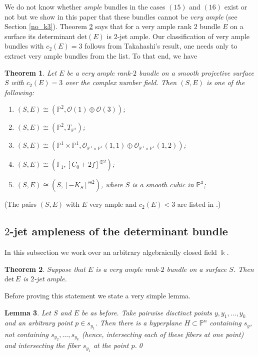 \documentclass[a4paper]{amsart}
\theoremstyle{plain}
\newtheorem{theorem}{Theorem}[section]
\newtheorem{lemma}[theorem]{Lemma}
\theoremstyle{definition}
\begin{document}
We do not know whether \textit{ample} bundles in the cases $(15)$ and $(16)$ exist or not but we show in this paper that these bundles cannot be \textit{very ample} (see Section \ref{no_k3}).
Theorem \ref{2-jet} says that for a very ample rank $2$ bundle $E$ on a surface its determinant $\mathrm{det}(E)$ is $2$-jet ample.
Our classification of very ample bundles with $c_2(E) = 3$ follows from Takahashi's result, one needs only to extract very ample bundles from the list.
To that end, we have
\begin{theorem}
    \label{classification3}
    Let $E$ be a very ample rank-$2$ bundle on a smooth projective surface $S$ with $c_2(E) = 3$ over the complex number field.
    Then $(S, E)$ is one of the following:
    \begin{enumerate}
        \item $(S, E) \cong (\mathbb P^2, \mathcal O(1)\oplus \mathcal O(3))$;
        \item $(S, E) \cong (\mathbb P^2, T_{\mathbb P^2})$;
        \item $(S, E) \cong (\mathbb P^1 \times \mathbb P^1, \mathcal O_{\mathbb P^1 \times \mathbb P^1}(1,1)\oplus  \mathcal O_{\mathbb P^1 \times \mathbb P^1}(1,2))$;
        \item $(S, E) \cong (\mathbb F_1, [C_0 + 2f]^{\oplus 2})$;
        \item $(S, E) \cong (S, [-K_S]^{\oplus 2})$, where $S$ is a smooth cubic in $\mathbb P^3$;
    \end{enumerate}
\end{theorem}

(The pairs $(S, E)$ with $E$ very ample and $c_2(E) < 3$ are listed in \cite[Theorem 11.1.3 and Theorem 11.4.5]{adjunction_theory}.)

\subsection{$2$-jet ampleness of the determinant bundle}
\label{2jetsection}
In this subsection we work over an arbitrary algebraically closed field $\Bbbk$.
\begin{theorem}
    \label{2-jet}
    Suppose that $E$ is a very ample rank-$2$ bundle on a surface $S$.
    Then $\mathrm{det}\, E$ is $2$-jet ample.
\end{theorem}
Before proving this statement we state a very simple lemma.
\begin{lemma}
    \label{obvious}
    Let $S$ and $E$ be as before. Take pairwise disctinct points $y, y_1,\dots, y_k$ and an arbitrary point $p \in s_{y_1}$.
    Then there is a hyperplane $H \subset \mathbb P^n$ containing $s_y$, not containing $s_{y_2}, \dots, s_{y_k}$ (hence, intersecting each of these fibers at one point) and intersecting the fiber $s_{y_1}$ at the point $p$.\qed
\end{lemma}
\end{document}
